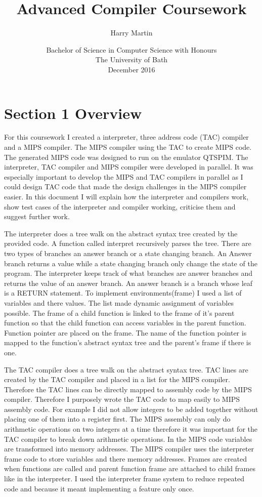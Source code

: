 \documentclass{article}
\title{Advanced Compiler Coursework}
\author{Harry Martin}
\date{Bachelor of Science in Computer Science with Honours\\The University of Bath\\December 2016}
\begin{document}
	
	\maketitle
	\section{Section 1 Overview}
	
	For this coursework I created a interpreter, three address code (TAC)  compiler and a MIPS compiler. The MIPS compiler using the TAC to create MIPS code. The generated MIPS code was designed to run on the emulator QTSPIM. The interpreter, TAC compiler and MIPS compiler were developed in parallel. It was especially important to develop the MIPS and TAC compilers in parallel as I could design TAC code that made the design challenges in the MIPS compiler easier. In this document I will explain how the interpreter and compilers work, show test cases of the interpreter and compiler working, criticise them and suggest further work.
	
	The interpreter does a tree walk on the abstract syntax tree created by the provided code. A function called interpret recursively parses the tree. There are two types of branches an answer branch or a state changing branch. An Answer branch returns a value while a state changing branch only change the state of the program. The interpreter keeps track of what branches are answer branches and returns the value of an answer branch. An answer branch is a branch whose leaf is a RETURN statement. To implement environments(frame) I used a list of variables and there values. The list made dynamic assignment of variables possible. The frame of a child function is linked to the frame of it's parent function so that the child function can access variables in the parent function. Function pointer are placed on the frame. The name of the function pointer is mapped to the function's abstract syntax tree and the parent's frame if there is one.
	
	The TAC compiler does a tree walk on the abstract syntax tree. TAC lines are created by the TAC compiler and placed in a list for the MIPS compiler. Therefore the TAC lines can be directly mapped to assembly code by the MIPS compiler. Therefore I purposely wrote the TAC code to map easily to MIPS assembly code. For example I did not allow integers to be added together without placing one of them into a register first. The MIPS assembly can only do arithmetic operations on two integers at a time therefore it was important for the TAC compiler to break down arithmetic operations. In the MIPS code variables are transformed into memory addresses. The MIPS compiler uses the interpreter frame code to store variables and there memory addresses. Frames are created when functions are called and parent function frame are attached to child frames like in the interpreter. I used the interpreter frame system to reduce repeated code and because it meant implementing a feature only once.
	
\end{document}
